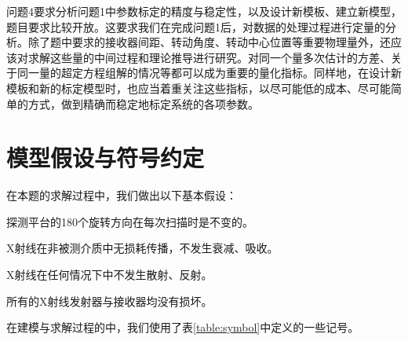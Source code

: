 问题4要求分析问题1中参数标定的精度与稳定性，以及设计新模板、建立新模型，题目要求比较开放。这要求我们在完成问题1后，对数据的处理过程进行定量的分析。除了题中要求的接收器间距、转动角度、转动中心位置等重要物理量外，还应该对求解这些量的中间过程和理论推导进行研究。对同一个量多次估计的方差、关于同一量的超定方程组解的情况等都可以成为重要的量化指标。同样地，在设计新模板和新的标定模型时，也应当着重关注这些指标，以尽可能低的成本、尽可能简单的方式，做到精确而稳定地标定系统的各项参数。

\section{模型假设与符号约定}

在本题的求解过程中，我们做出以下基本假设：

\begin{assumption}
探测平台的180个旋转方向在每次扫描时是不变的。
\end{assumption}

\begin{assumption}
X射线在非被测介质中无损耗传播，不发生衰减、吸收。
\end{assumption}

\begin{assumption}
X射线在任何情况下中不发生散射、反射。
\end{assumption}

\begin{assumption}
所有的X射线发射器与接收器均没有损坏。
\end{assumption}

在建模与求解过程的中，我们使用了表\ref{table:symbol}中定义的一些记号。

